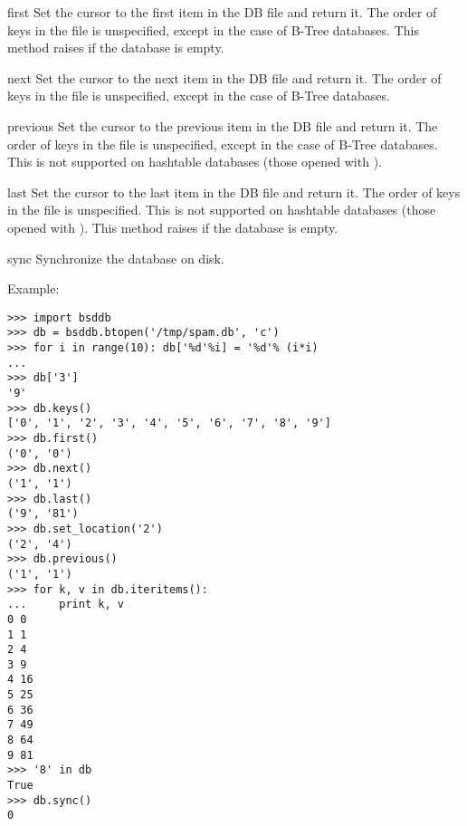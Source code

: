\begin{methoddesc}{first}{}
Set the cursor to the first item in the DB file and return it.  The order of 
keys in the file is unspecified, except in the case of B-Tree databases.
This method raises  if the database is empty.
\end{methoddesc}

\begin{methoddesc}{next}{}
Set the cursor to the next item in the DB file and return it.  The order of 
keys in the file is unspecified, except in the case of B-Tree databases.
\end{methoddesc}

\begin{methoddesc}{previous}{}
Set the cursor to the previous item in the DB file and return it.  The
order of keys in the file is unspecified, except in the case of B-Tree
databases.  This is not supported on hashtable databases (those opened
with ).
\end{methoddesc}

\begin{methoddesc}{last}{}
Set the cursor to the last item in the DB file and return it.  The
order of keys in the file is unspecified.  This is not supported on
hashtable databases (those opened with ).
This method raises  if the database is empty.
\end{methoddesc}

\begin{methoddesc}{sync}{}
Synchronize the database on disk.
\end{methoddesc}

Example:

\begin{verbatim}
>>> import bsddb
>>> db = bsddb.btopen('/tmp/spam.db', 'c')
>>> for i in range(10): db['%d'%i] = '%d'% (i*i)
... 
>>> db['3']
'9'
>>> db.keys()
['0', '1', '2', '3', '4', '5', '6', '7', '8', '9']
>>> db.first()
('0', '0')
>>> db.next()
('1', '1')
>>> db.last()
('9', '81')
>>> db.set_location('2')
('2', '4')
>>> db.previous() 
('1', '1')
>>> for k, v in db.iteritems():
...     print k, v
0 0
1 1
2 4
3 9
4 16
5 25
6 36
7 49
8 64
9 81
>>> '8' in db
True
>>> db.sync()
0
\end{verbatim}
